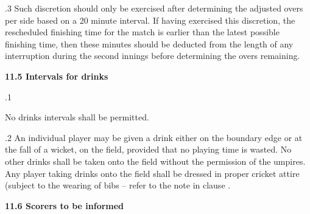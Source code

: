 \documentclass[12pt]{article}
\begin{document}
\vspace{\baselineskip}
\begin{adjustwidth}{0.5in}{0.01in}
{\fontsize{9pt}{10.8pt}.3 \tabto{0.49in} Such discretion should only be exercised after determining the adjusted overs per side based on a 20 minute interval. If having exercised this discretion, the rescheduled finishing time for the match is earlier than the latest possible finishing time, then these minutes should be deducted from the length of any interruption during the second innings before determining the overs remaining.\par}\par

\end{adjustwidth}


\vspace{\baselineskip}
{\fontsize{11pt}{13.2pt}\selectfont \textbf{11.5 \tabto{0.47in} Intervals for drinks}\par}\par


\vspace{\baselineskip}
{\fontsize{9pt}{10.8pt}.1 \tabto{0.49in} {\fontsize{8pt}{9.6pt}\selectfont No drinks intervals shall be permitted.\par}\par}\par


\vspace{\baselineskip}
\begin{adjustwidth}{0.5in}{0.06in}
\begin{justify}
{\fontsize{9pt}{10.8pt}.2 \tabto{0.49in} An individual player may be given a drink either on the boundary edge or at the fall of a wicket, on the field, provided that no playing time is wasted. No other drinks shall be taken onto the field without the permission of the umpires. Any player taking drinks onto the field shall be dressed in proper cricket attire (subject to the wearing of bibs – refer to the note in clause .\par}
\end{justify}\par

\end{adjustwidth}


\vspace{\baselineskip}
{\fontsize{11pt}{13.2pt}\selectfont \textbf{11.6 \tabto{0.47in} Scorers to be informed}\par}\par
\end{document}
